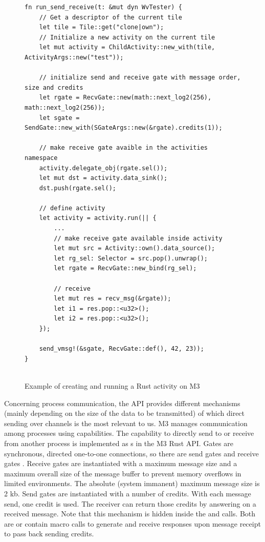 \begin{figure}
    \centering
    \begin{verbatim}
fn run_send_receive(t: &mut dyn WvTester) {
    // Get a descriptor of the current tile
    let tile = Tile::get("clone|own");
    // Initialize a new activity on the current tile
    let mut activity = ChildActivity::new_with(tile, ActivityArgs::new("test"));

    // initialize send and receive gate with message order, size and credits 
    let rgate = RecvGate::new(math::next_log2(256), math::next_log2(256));
    let sgate = SendGate::new_with(SGateArgs::new(&rgate).credits(1));

    // make receive gate avaible in the activities namespace
    activity.delegate_obj(rgate.sel());
    let mut dst = activity.data_sink();
    dst.push(rgate.sel();

    // define activity 
    let activity = activity.run(|| {
        ...
        // make receive gate available inside activity
        let mut src = Activity::own().data_source();
        let rg_sel: Selector = src.pop().unwrap();
        let rgate = RecvGate::new_bind(rg_sel);

        // receive 
        let mut res = recv_msg(&rgate));
        let i1 = res.pop::<u32>();
        let i2 = res.pop::<u32>();
    });

    send_vmsg!(&sgate, RecvGate::def(), 42, 23));
}
    
    \end{verbatim}
    \caption{Example of creating and running a Rust activity on M3}
    \label{fig:startingActivity}
\end{figure}

Concerning process communication, the API provides different mechanisms (mainly depending on the size of the data to be transmitted) of which direct sending over channels is the most relevant to us. M3 manages communication among processes using capabilities. The capability to directly send to or receive from another process is implemented as s in the M3 Rust API. Gates are synchronous, directed one-to-one connections, so there are send gates  and receive gates . Receive gates are instantiated with a maximum message size and a maximum overall size of the message buffer to prevent memory overflows in limited environments. The absolute (system immanent) maximum message size is 2 kb. Send gates are instantiated with a number of credits. With each message send, one credit is used. The receiver can return those credits by answering on a received message. Note that this mechanism is hidden inside the  and  calls. Both are or contain macro calls to generate and receive responses upon message receipt to pass back sending credits. \\

